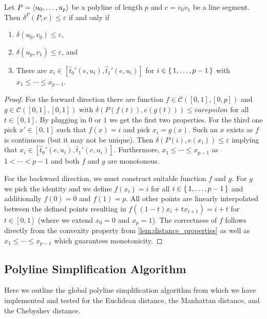 \begin{lemma}\label{lem:ag-neq}
	Let \(P = \left\langle u_0, \dots, u_p\right\rangle\) be a polyline of length \(p\) and \(e = \overline{v_0v_1}\) be a line segment. Then 
	\(\delta^F(P, e) \leq \varepsilon\) if and only if 
	\begin{enumerate}
		\item \(\delta(u_0, v_0) \leq \varepsilon\),
		\item \(\delta(u_p, v_1) \leq \varepsilon\), and
		\item There are \(x_i \in [\hat t_0'(e, u_i), \hat t_1'(e, u_i)]\) for \(i \in \set{1, \dots, p - 1}\) with \(x_1 \leq \cdots \leq x_{p-1}\).
	\end{enumerate}
\end{lemma}
\begin{proof}
	For the forward direction there are function \(f \in \mathcal{C}([0,1], [0, p])\) and \(g \in \mathcal{C}([0,1], [0, 1])\) with \(\delta(P(f(t)), e(g(t))) \leq varepsilon\) for all \(t \in [0, 1]\). By plugging in \(0\) or \(1\) we get the first two properties. For the third one pick \(x' \in [0, 1]\) such that \(f(x) = i\) and pick \(x_i = g(x)\). Such an \(x\) exists as \(f\) is continuous (but it may not be unique). Then \(\delta(P(i), e(x_i)) \leq \varepsilon \) implying that \(x_i \in [\hat t_0'(e, u_i), \hat t_1'(e, u_i)]\). Furthermore, \(x_1 \leq \cdots \leq x_{p-1}\) as \(1 < \cdots < p-1\) and both \(f\) and \(g\) are monotonous.

	For the backward direction, we must construct suitable function \(f\) and \(g\). For \(g\) we pick the identity and we define \(f(x_i) = i\) for all \(i \in \set{1, \dots, p - 1}\) and additionally \(f(0) = 0\) and \(f(1) = p\). All other points are linearly interpolated between the defined points resulting in \(f((1-t)x_i + tx_{i+1}) = i + t\) for \(t\in [0,1]\) (where we extend \(x_0 = 0\) and \(x_p = 1\)). The correctness of \(f\) follows directly from the convexity property from \cref{lem:distance_properties} as well as \(x_1 \leq \cdots \leq x_{p-1}\) which guarantees monotonicity.
\end{proof}

\subsection{Polyline Simplification Algorithm}
\label{ssec:simple_algo_main}

Here we outline the global polyline simplification algorithm from \citeauthor{on_optimal_polyline_simplification_using_the_hausdorff_and_frechet_distance} which we have implemented and tested for the Euclidean distance, the Manhattan distance, and the Chebyshev distance. 

